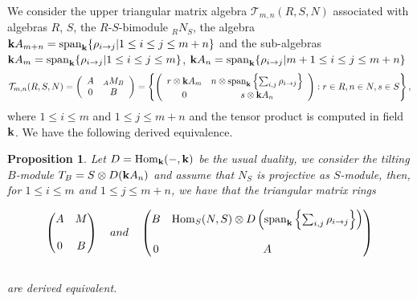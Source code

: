 \documentclass[a4paper, reqno]{amsart}
\newtheorem{prop}[thm]{Proposition}
\theoremstyle{definition}
\theoremstyle{remark}
\numberwithin{equation}{section}
\def\Hom{{\rm Hom}}
\begin{document}
We consider the upper triangular matrix algebra $ \mathcal{T}_{m,n}(R,S,N) $ associated with algebras $R$, $S$, the $R$-$S$-bimodule ${_R}N{_S}$, the algebra ${\bf k}A_{m+n} = {\rm span}_{\bf k} \{ \rho_{i\to j} | 1\leq i\leq j\leq m+n\}$ and the sub-algebras ${\bf k}A_{m} = {\rm span}_{\bf k} \{ \rho_{i\to j} | 1\leq i\leq j\leq m\}$, ${\bf k}A_{n} = {\rm span}_{\bf k} \{ \rho_{i\to j} | m+1\leq i\leq j\leq m+n\}$
$$
\mathcal{T}_{m,n}(R,S,N) = \left(\begin{array}{ccc}
A & {_A}M_{B}  \\
0 & B 
\end{array}
\right)
= \left\{ \left(\begin{array}{ccc}
r\otimes  {{\bf k} A_{m}} & n \otimes {\rm span}_{\bf k}\left\{ \sum_{i,j}\rho_{i\to j} \right\}  \\
0 & s\otimes {{\bf k} A_{n}} 

\end{array}
\right): r\in R, n \in N, s\in S  \right\},
$$
where $1\leq i \leq m$ and $ 1\leq j \leq m+n$ and the tensor product is computed in field ${\bf k}$. We have the following derived equivalence. 

\begin{prop} \label{TensorHom}
    Let $D = \Hom_{\bf k}{(-,{\bf k})}$ be the usual duality, we consider the tilting $B$-module $T_B= S\otimes D({\bf k} A_n )$ and assume that $N_S$ is  projective as $S$-module, then, for $1\leq i \leq m$ and $1 \leq j \leq m+n$, we have that the triangular matrix rings 

$$
     \left( \begin{matrix}
     A  & M      \cr\cr
     0  & B      
\end{matrix}\right)\,\,\,\,\,\,
 and\,\,\,\,\,\,
 \left( \begin{matrix}
   B  & \Hom_{S}(N,S)\otimes D \left( {\rm span}_{\bf k}\left\{ \sum_{i,j}\rho_{i\to j} \right\} \right)    \cr\cr
     0  & A     
\end{matrix}\right)
 $$\\
 are derived equivalent.
    
\end{prop} 
\end{document}
